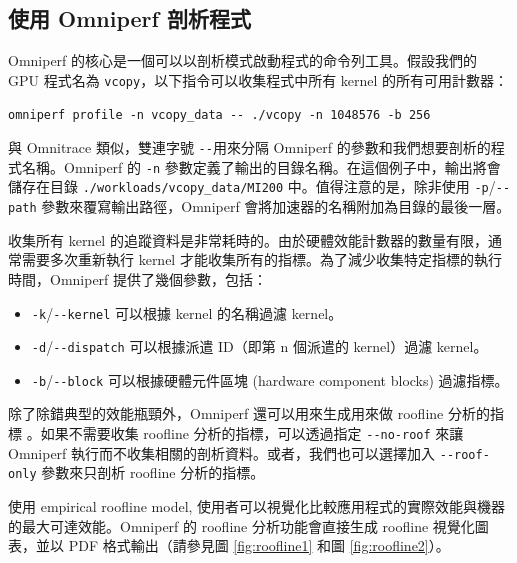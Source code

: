 \subsection{使用 Omniperf 剖析程式}
Omniperf 的核心是一個可以以剖析模式啟動程式的命令列工具。假設我們的 GPU 程式名為 \lstinline|vcopy|，以下指令可以收集程式中所有 kernel 的所有可用計數器：

\lstinline|omniperf profile -n vcopy_data -- ./vcopy -n 1048576 -b 256|

與 Omnitrace 類似，雙連字號 \lstinline|--|用來分隔 Omniperf 的參數和我們想要剖析的程式名稱。Omniperf 的 \lstinline|-n| 參數定義了輸出的目錄名稱。在這個例子中，輸出將會儲存在目錄 \lstinline|./workloads/vcopy_data/MI200| 中。值得注意的是，除非使用 \lstinline|-p|/\lstinline|--path| 參數來覆寫輸出路徑，Omniperf 會將加速器的名稱附加為目錄的最後一層。

收集所有 kernel 的追蹤資料是非常耗時的。由於硬體效能計數器的數量有限，通常需要多次重新執行 kernel 才能收集所有的指標。為了減少收集特定指標的執行時間，Omniperf 提供了幾個參數，包括：

\begin{itemize}
\item \lstinline|-k|/\lstinline|--kernel| 可以根據 kernel 的名稱過濾 kernel。
\item \lstinline|-d|/\lstinline|--dispatch| 可以根據派遣 ID（即第 n 個派遣的 kernel）過濾 kernel。
\item \lstinline|-b|/\lstinline|--block| 可以根據硬體元件區塊 (hardware component blocks) 過濾指標。
\end{itemize}

除了除錯典型的效能瓶頸外，Omniperf 還可以用來生成用來做 roofline 分析的指標 \cite{williams2009roofline}。如果不需要收集 roofline 分析的指標，可以透過指定 \lstinline|--no-roof| 來讓 Omniperf 執行而不收集相關的剖析資料。或者，我們也可以選擇加入 \lstinline|--roof-only| 參數來只剖析 roofline 分析的指標。

使用 empirical roofline model, 使用者可以視覺化比較應用程式的實際效能與機器的最大可達效能。Omniperf 的 roofline 分析功能會直接生成 roofline 視覺化圖表，並以 PDF 格式輸出（請參見圖 \ref{fig:roofline1} 和圖 \ref{fig:roofline2}）。

